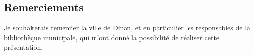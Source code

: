 \documentclass[a0,landscape]{a0poster}
\begin{document}
\begin{multicols}{4}

\nocite{*} %


\section*{Remerciements}

Je souhaiterais remercier la ville de Dinan, et en particulier les responsables de la bibliothèque municipale, qui m'ont donné la possibilité de réaliser cette présentation.

\end{multicols}
\end{document}
